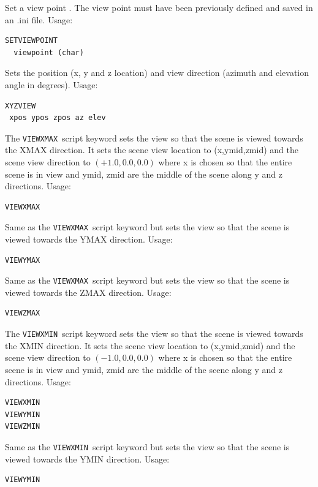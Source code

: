 \documentclass[11pt,twoside]{book}
\begin{document}
Set a view point .  The view point must have been previously defined and
saved in an .ini file.
Usage:
\begin{lstlisting}
SETVIEWPOINT
  viewpoint (char)
\end{lstlisting}

Sets the position (x, y and z location) and view direction (azimuth and elevation angle in degrees).
Usage:
\begin{lstlisting}
XYZVIEW
 xpos ypos zpos az elev
\end{lstlisting}

The {\tt VIEWXMAX}\ script keyword sets the view so that the scene
is viewed towards the XMAX direction.  It sets
the scene view location to (x,ymid,zmid)
and the scene view direction to $(+1.0,0.0,0.0)$ where
x is chosen so that the entire scene is in view and ymid, zmid
are the middle of the scene along y and z directions.
Usage:
\begin{lstlisting}
VIEWXMAX
\end{lstlisting}

Same as the {\tt VIEWXMAX}\ script keyword but sets the view so that the scene
is viewed towards the YMAX direction.
Usage:
\begin{lstlisting}
VIEWYMAX
\end{lstlisting}

Same as the {\tt VIEWXMAX}\ script keyword but sets the view so that the scene
is viewed towards the ZMAX direction.
Usage:
\begin{lstlisting}
VIEWZMAX
\end{lstlisting}

The {\tt VIEWXMIN}\ script keyword sets the view so that the scene
is viewed towards the XMIN direction.  It sets
the scene view location to (x,ymid,zmid)
and the scene view direction to $(-1.0,0.0,0.0)$ where
x is chosen so that the entire scene is in view and ymid, zmid
are the middle of the scene along y and z directions.
Usage:
\begin{lstlisting}
VIEWXMIN
VIEWYMIN
VIEWZMIN
\end{lstlisting}

Same as the {\tt VIEWXMIN}\ script keyword but sets the view so that the scene
is viewed towards the YMIN direction.
Usage:
\begin{lstlisting}
VIEWYMIN
\end{lstlisting}
\end{document}
